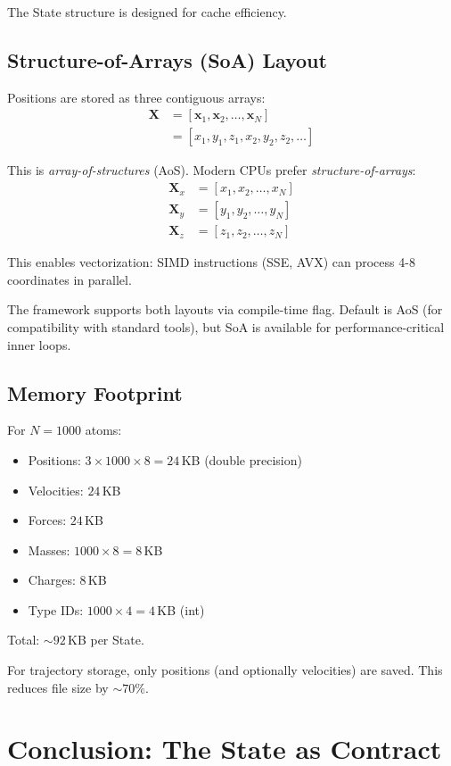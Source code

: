 \documentclass[11pt]{article}
\begin{document}
The State structure is designed for cache efficiency.

\subsection{Structure-of-Arrays (SoA) Layout}

Positions are stored as three contiguous arrays:
\begin{align}
\mathbf{X} &= [\mathbf{x}_1, \mathbf{x}_2, \ldots, \mathbf{x}_N] \\
&= [x_1, y_1, z_1, x_2, y_2, z_2, \ldots]
\end{align}

This is \textit{array-of-structures} (AoS). Modern CPUs prefer \textit{structure-of-arrays}:
\begin{align}
\mathbf{X}_x &= [x_1, x_2, \ldots, x_N] \\
\mathbf{X}_y &= [y_1, y_2, \ldots, y_N] \\
\mathbf{X}_z &= [z_1, z_2, \ldots, z_N]
\end{align}

This enables vectorization: SIMD instructions (SSE, AVX) can process 4-8 coordinates in parallel.

The framework supports both layouts via compile-time flag. Default is AoS (for compatibility with standard tools), but SoA is available for performance-critical inner loops.

\subsection{Memory Footprint}

For $N = 1000$ atoms:
\begin{itemize}
\item Positions: $3 \times 1000 \times 8 = 24$\,KB (double precision)
\item Velocities: $24$\,KB
\item Forces: $24$\,KB
\item Masses: $1000 \times 8 = 8$\,KB
\item Charges: $8$\,KB
\item Type IDs: $1000 \times 4 = 4$\,KB (int)
\end{itemize}

Total: $\sim 92$\,KB per State.

For trajectory storage, only positions (and optionally velocities) are saved. This reduces file size by $\sim 70\%$.

\section{Conclusion: The State as Contract}
\end{document}
